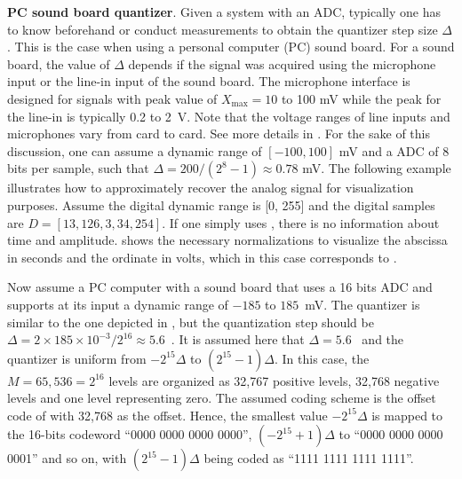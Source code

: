 \bApplication \textbf{PC sound board quantizer}.
\label{app:sound_board_quantizer}
Given a system with an ADC, typically one has to know beforehand or conduct measurements to obtain the quantizer step size $\Delta$. This is the case when using a personal computer (PC) sound board. For a sound board, the value of $\Delta$ depends if the signal was acquired using the microphone input or the line-in input of the sound board. The microphone interface is designed for signals with peak value of $X_{\textrm{max}}=10$ to 100 mV while the peak for the line-in is typically 0.2 to 2~V. Note that the voltage ranges of line inputs and microphones vary from card to card. See more details in . For the sake of this discussion, one can assume a dynamic range of $[-100, 100]$ mV and a ADC of 8 bits per sample, such that $\Delta = 200/(2^8-1) \approx 0.78$ mV. The following example illustrates how to approximately recover the analog signal for visualization purposes.
Assume the digital dynamic range is [0, 255] and the digital samples are $D=[13, 126, 3, 34, 254]$. If one simply uses , there is no information about time and amplitude.  shows the necessary normalizations to visualize the abscissa in seconds and the ordinate in volts, which in this case corresponds to .

Now assume a PC computer with a sound board that uses a 
16 bits ADC and supports at its input a dynamic range of $-185$ to $185$~mV. The quantizer is similar to the one depicted in , but the quantization step should be $\Delta=2 \times 185 \times 10^{-3}/2^{16} \approx 5.6$~\muV. It is assumed here that $\Delta = 5.6$ \muV~and the quantizer is uniform from 
$-2^{15}\Delta$ to $(2^{15}-1)\Delta$. In this case, the $M=65,536=2^{16}$ levels are organized as 32,767 positive levels, 32,768 negative levels and one level representing zero. The assumed coding scheme is the offset code of  with 32,768 as the offset. Hence, the smallest value $-2^{15}\Delta$ is mapped to the 16-bits codeword ``0000 0000 0000 0000'', $(-2^{15}+1)\Delta$ to ``0000 0000 0000 0001'' and so on, with $(2^{15}-1)\Delta$ being coded as ``1111 1111 1111 1111''. 

